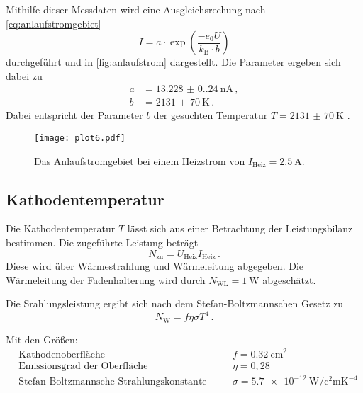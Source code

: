 Mithilfe dieser Messdaten wird eine Ausgleichsrechung nach \autoref{eq:anlaufstromgebiet}
\begin{equation}
  I=a \cdot \exp \left(\frac{-e_{0} U}{k_{\text{B}} \cdot b}\right)
\end{equation}
durchgeführt und in \autoref{fig:anlaufstrom} dargestellt. Die Parameter ergeben sich dabei zu
\begin{align*}
  a &= \qty{13.228(0.240)}{\nano\ampere} \, , \\
  b &= \qty{2131(70)}{\kelvin} \, . 
\end{align*}
Dabei entspricht der Parameter $b$ der gesuchten Temperatur $T = \qty{2131(70)}{\kelvin}$ .

\begin{figure}[H]
  \centering
  \texttt{[image: plot6.pdf]}
  \caption{Das Anlaufstromgebiet bei einem Heizstrom von $I_\text{Heiz} = \qty{2,5}{\ampere}$.}
  \label{fig:anlaufstrom}
\end{figure}


\subsection{Kathodentemperatur}

Die Kathodentemperatur $T$ lässt sich aus einer Betrachtung der Leistungsbilanz bestimmen.
Die zugeführte Leistung beträgt
\begin{equation*}
  N_{\text{zu}}=U_{\text{Heiz}} I_{\text{Heiz}} \, .
\end{equation*}
Diese wird über Wärmestrahlung und Wärmeleitung abgegeben. 
Die Wärmeleitung der Fadenhalterung wird durch $N_{\text{WL}} = \qty{1}{\watt}$ abgeschätzt. 

Die Srahlungsleistung ergibt sich nach dem Stefan-Boltzmannschen Gesetz zu
\begin{equation*}
  N_{\mathrm{W}}=f \eta \sigma T^{4} \, .
\end{equation*}

Mit den Größen:
\begin{align*}
  & \text{Kathodenoberfläche} & \quad & f = \qty{0.32}{\centi\meter\squared} \\
  & \text{Emissionsgrad der Oberfläche} & \quad & \eta=0,28 \\
  & \text{Stefan-Boltzmannsche Strahlungskonstante} & \quad & \sigma = \qty{5.7e-12}{\watt\per\square\centi\meter\kelvin\tothe{-4}} 
\end{align*}

